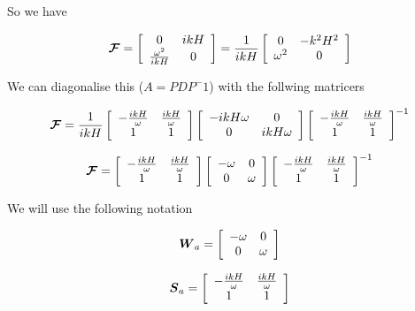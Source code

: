 \documentclass[12pt]{article}
\begin{document}
So we have

\[\boldsymbol{\mathcal{F}} = \left[\begin{array}{c c}
0 & ikH \\ \frac{\omega^2}{ikH} &  0
\end{array}\right]  = \frac{1}{ikH} \left[\begin{array}{c c}
0 & -k^2H^2 \\ \omega^2 &  0
\end{array}\right] \]

We can diagonalise this ($A = P D P^-1$) with the follwing matricers

\[\boldsymbol{\mathcal{F}} = \frac{1}{ikH}\left[\begin{array}{c c}
- \frac{i kH}{\omega} & \frac{i kH}{\omega} \\ 1 &  1
\end{array}\right]  \left[\begin{array}{c c}
- i kH\omega & 0 \\ 0 &  i kH\omega
\end{array}\right] \left[\begin{array}{c c}
- \frac{i kH}{\omega} & \frac{i kH}{\omega} \\ 1 &  1
\end{array}\right]^{-1}\]

\[\boldsymbol{\mathcal{F}} = \left[\begin{array}{c c}
- \frac{i kH}{\omega} & \frac{i kH}{\omega} \\ 1 &  1
\end{array}\right]  \left[\begin{array}{c c}
- \omega & 0 \\ 0 &  \omega
\end{array}\right] \left[\begin{array}{c c}
- \frac{i kH}{\omega} & \frac{i kH}{\omega} \\ 1 &  1
\end{array}\right]^{-1}\]

We will use the following notation

\[\boldsymbol{W}_a = \left[\begin{array}{c c}
- \omega & 0 \\ 0 &  \omega
\end{array}\right]\]

\[\boldsymbol{S}_a = \left[\begin{array}{c c}
- \frac{i kH}{\omega} & \frac{i kH}{\omega} \\ 1 &  1
\end{array}\right]\]
\end{document}
